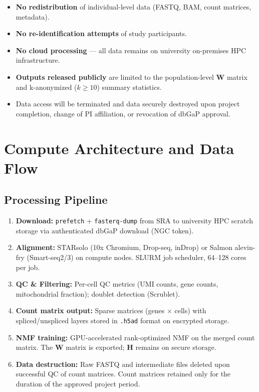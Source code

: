 \documentclass[11pt,letterpaper]{article}
\begin{document}
\begin{itemize}[nosep]
    \item \textbf{No redistribution} of individual-level data (FASTQ,
          BAM, count matrices, metadata).
    \item \textbf{No re-identification attempts} of study participants.
    \item \textbf{No cloud processing} --- all data remains on
          university on-premises HPC infrastructure.
    \item \textbf{Outputs released publicly} are limited to the
          population-level $\mathbf{W}$ matrix and k-anonymized
          ($k \geq 10$) summary statistics.
    \item Data access will be terminated and data securely destroyed
          upon project completion, change of PI affiliation, or
          revocation of dbGaP approval.
\end{itemize}

\section{Compute Architecture and Data Flow}

\subsection{Processing Pipeline}

\begin{enumerate}[nosep]
    \item \textbf{Download:} \texttt{prefetch} + \texttt{fasterq-dump}
          from SRA to university HPC scratch storage via authenticated
          dbGaP download (NGC token).
    \item \textbf{Alignment:} STARsolo (10x Chromium, Drop-seq,
          inDrop) or Salmon alevin-fry (Smart-seq2/3) on compute nodes.
          SLURM job scheduler, 64--128 cores per job.
    \item \textbf{QC \& Filtering:} Per-cell QC metrics (UMI counts,
          gene counts, mitochondrial fraction); doublet detection
          (Scrublet).
    \item \textbf{Count matrix output:} Sparse matrices (genes $\times$
          cells) with spliced/unspliced layers stored in
          \texttt{.h5ad} format on encrypted storage.
    \item \textbf{NMF training:} GPU-accelerated rank-optimized NMF on
          the merged count matrix. The $\mathbf{W}$ matrix is exported;
          $\mathbf{H}$ remains on secure storage.
    \item \textbf{Data destruction:} Raw FASTQ and intermediate files
          deleted upon successful QC of count matrices. Count matrices
          retained only for the duration of the approved project period.
\end{enumerate}
\end{document}
